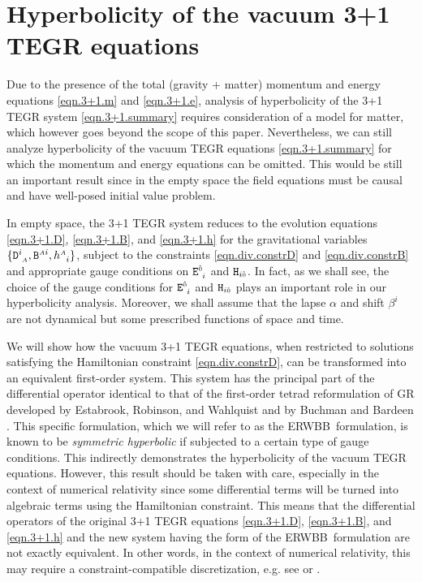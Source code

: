 \documentclass[
10pt, %
a4paper, %
oneside, %
twocolumn,
headinclude,footinclude, %
BCOR5mm, %
]{scrartcl}
\newcommand{\ERWBB}{{ERWBB}}
\newcommand{\sA}{\mathsmaller A}
\newcommand{\tetrsymbol}{h}
\newcommand{\tetr}[2]{\tetrsymbol^{#1}_{\phantom{#1}#2}}
\newcommand{\Dfin}[2]{\mathtt{D}_{\phantom{#2}#1}^{#2}}	%
\newcommand{\Hfin}[2]{\mathtt{H}_{#2#1}}	%
\newcommand{\Efin}[2]{\mathtt{E}^{#1}_{\phantom{#1}#2}}	%
\newcommand{\Bfin}[2]{\mathtt{B}^{#1#2}}	%
\newcommand{\indalg}[1]{\hat{\mathsmaller{#1}}}
\newcommand{\lapse}{\alpha}
\newcommand{\shift}[1]{\beta^{#1}}
\begin{document}
	
	\section{Hyperbolicity of the vacuum 3+1 TEGR equations}\label{sec.hyperbolicity}

	Due to the presence of the total (gravity + matter) momentum and energy
	equations \eqref{eqn.3+1.m} and \eqref{eqn.3+1.e}, analysis of hyperbolicity
	of the 3+1 TEGR system \eqref{eqn.3+1.summary} requires consideration of a
	model for matter, which however goes beyond the scope of this paper.
	Nevertheless, we can still analyze hyperbolicity of the vacuum TEGR
	equations \eqref{eqn.3+1.summary} for which the momentum and energy
	equations can be omitted. This would be still an important result since in
	the empty space the field equations must be causal and have well-posed
	initial value problem. 
	
	In empty space, the 3+1 TEGR system reduces to the evolution equations
	\eqref{eqn.3+1.D}, \eqref{eqn.3+1.B}, and \eqref{eqn.3+1.h} for the
	gravitational variables $\{\Dfin{\sA}{i},\Bfin{\sA}{i},\tetr{\sA}{i}\}$,
	subject to the constraints \eqref{eqn.div.constrD} and
	\eqref{eqn.div.constrB} and appropriate gauge conditions on
	$\Efin{\indalg{0}}{i}$ and $\Hfin{\indalg{0}}{i}$. In fact, as we shall see,
	the choice of the gauge conditions for $\Efin{\indalg{0}}{i}$ and
	$\Hfin{\indalg{0}}{i}$ plays an important role in our hyperbolicity
	analysis. Moreover, we shall assume that the lapse $\lapse$ and shift
	$\shift{i}$ are not dynamical but some prescribed functions of space and
	time.

	We will show how the vacuum 3+1 TEGR equations, when restricted to
	solutions satisfying the Hamiltonian constraint \eqref{eqn.div.constrD}, can
	be transformed into an equivalent first-order system. This system has the
	principal part of the differential operator identical to that of the
	first-order tetrad reformulation of GR developed by Estabrook, Robinson, and
	Wahlquist \cite{Estabrook1997} and by Buchman and Bardeen
	\cite{Estabrook1997}. This specific formulation, which we will refer to as
	the \ERWBB\ formulation, is known to be \textit{symmetric hyperbolic} if
	subjected to a certain type of gauge conditions. This indirectly
	demonstrates the hyperbolicity of the vacuum TEGR equations. However, this
	result should be taken with care, especially in the context of numerical
	relativity since some differential terms will be turned into algebraic terms
	using the Hamiltonian constraint. This means that the differential operators
	of the original 3+1 TEGR equations \eqref{eqn.3+1.D}, \eqref{eqn.3+1.B}, and
	\eqref{eqn.3+1.h} and the new system having the form of the \ERWBB\
	formulation are not exactly equivalent. In other words, in the context of
	numerical relativity, this may require a constraint-compatible
	discretization, e.g. see \cite[Sec.VI.G]{Olivares2022} or
	\cite{oliynyk2025}.
\end{document}
